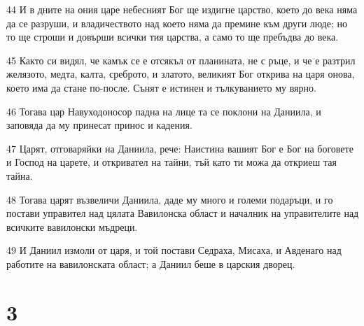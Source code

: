 \par 44 И в дните на ония царе небесният Бог ще издигне царство, което до века няма да се разруши, и владичеството над което няма да премине към други люде; но то ще строши и довърши всички тия царства, а само то ще пребъдва до века.
\par 45 Както си видял, че камък се е отсякъл от планината, не с ръце, и че е разтрил желязото, медта, калта, среброто, и златото, великият Бог открива на царя онова, което има да стане по-после. Сънят е истинен и тълкуванието му вярно.
\par 46 Тогава цар Навуходоносор падна на лице та се поклони на Даниила, и заповяда да му принесат принос и кадения.
\par 47 Царят, отговаряйки на Даниила, рече: Наистина вашият Бог е Бог на боговете и Господ на царете, и откривател на тайни, тъй като ти можа да откриеш тая тайна.
\par 48 Тогава царят възвеличи Даниила, даде му много и големи подаръци, и го постави управител над цялата Вавилонска област и началник на управителите над всичките вавилонски мъдреци.
\par 49 И Даниил измоли от царя, и той постави Седраха, Мисаха, и Авденаго над работите на вавилонската област; а Даниил беше в царския дворец.

\chapter{3}

